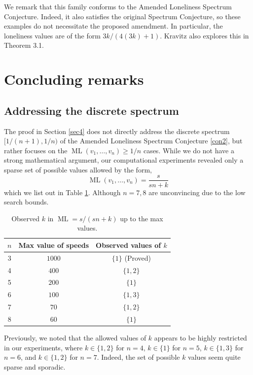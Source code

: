 \documentclass[11pt]{amsart}
\DeclareMathOperator{\ML}{ML}
\begin{document}
We remark that this family conforms to the Amended Loneliness Spectrum Conjecture. Indeed, it also satisfies the original Spectrum Conjecture, so these examples do not necessitate the proposed amendment. In particular, the loneliness values are of the form $3k/(4(3k) + 1)$. Kravitz also explores this in \cite{kravitz} Theorem 3.1.

\section{Concluding remarks}
\label{sec5}
\subsection{Addressing the discrete spectrum}
\par The proof in Section \ref{sec4} does not directly address the discrete spectrum $[1 / (n + 1),1 / n)$ of the Amended Loneliness Spectrum Conjecture \ref{con2}, but rather focuses on the $\ML(v_1,\ldots,v_n) \geq 1 / n$ cases. While we do not have a strong mathematical argument, our computational experiments revealed only a sparse set of possible values allowed by the form,
$$\ML(v_1, \ldots, v_n) = \frac{s}{sn + k}$$
which we list out in Table \ref{table1}. Although $n=7, 8$ are unconvincing due to the low search bounds.

\begin{table}[h]
\centering
\begin{tabular}{@{}ccc@{}}
\toprule
$n$ & Max value of speeds & Observed values of $k$ \\
\midrule
3 & $1000$ & $\{1\}$ (Proved) \\
4 & $400$  & $\{1, 2\}$ \\
5 & $200$  & $\{1\}$ \\
6 & $100$   & $\{1, 3\}$ \\
7 & $70$   & $\{1, 2\}$ \\
8 & $60$   & $\{1\}$ \\
\bottomrule
\end{tabular}
\caption{Observed $k$ in $\ML=s/(sn+k)$ up to the max values.}
\label{table1}
\end{table}

Previously, we noted that the allowed values of $k$ appears to be highly restricted in our experiments, where $k \in \{1, 2\}$ for $n = 4$, $k \in \{1\}$ for $n = 5$, $k \in \{1, 3\}$ for $n = 6$, and $k \in \{1, 2\}$ for $n = 7$. Indeed, the set of possible $k$ values seem quite sparse and sporadic.
\end{document}
